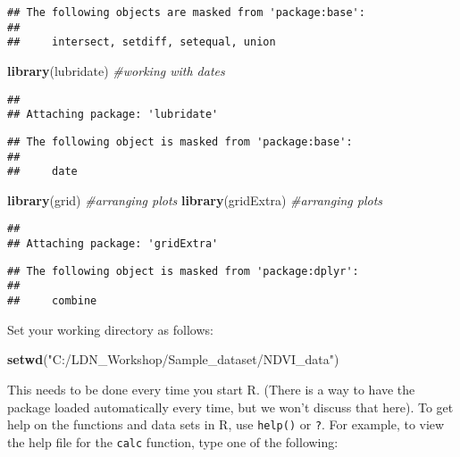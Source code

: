 \documentclass[]{article}
\newenvironment{Shaded}{\begin{snugshade}}{\end{snugshade}}
\newcommand{\KeywordTok}[1]{\textcolor[rgb]{0.13,0.29,0.53}{\textbf{{#1}}}}
\newcommand{\StringTok}[1]{\textcolor[rgb]{0.31,0.60,0.02}{{#1}}}
\newcommand{\CommentTok}[1]{\textcolor[rgb]{0.56,0.35,0.01}{\textit{{#1}}}}
\newcommand{\NormalTok}[1]{{#1}}
\begin{document}
\begin{verbatim}
## The following objects are masked from 'package:base':
## 
##     intersect, setdiff, setequal, union
\end{verbatim}

\begin{Shaded}
\begin{Highlighting}[]
\KeywordTok{library}\NormalTok{(lubridate) }\CommentTok{#working with dates}
\end{Highlighting}
\end{Shaded}

\begin{verbatim}
## 
## Attaching package: 'lubridate'
\end{verbatim}

\begin{verbatim}
## The following object is masked from 'package:base':
## 
##     date
\end{verbatim}

\begin{Shaded}
\begin{Highlighting}[]
\KeywordTok{library}\NormalTok{(grid) }\CommentTok{#arranging plots}
\KeywordTok{library}\NormalTok{(gridExtra) }\CommentTok{#arranging plots}
\end{Highlighting}
\end{Shaded}

\begin{verbatim}
## 
## Attaching package: 'gridExtra'
\end{verbatim}

\begin{verbatim}
## The following object is masked from 'package:dplyr':
## 
##     combine
\end{verbatim}

Set your working directory as follows:

\begin{Shaded}
\begin{Highlighting}[]
\KeywordTok{setwd}\NormalTok{(}\StringTok{"C:/LDN_Workshop/Sample_dataset/NDVI_data"}\NormalTok{)}
\end{Highlighting}
\end{Shaded}

This needs to be done every time you start R. (There is a way to have
the package loaded automatically every time, but we won't discuss that
here). To get help on the functions and data sets in R, use
\texttt{help()} or \texttt{?}. For example, to view the help file for
the \texttt{calc} function, type one of the following:
\end{document}
